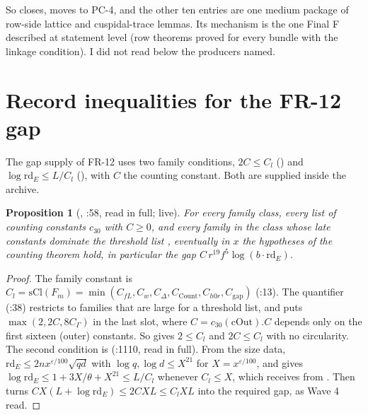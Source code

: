 \documentclass[11pt]{article}
\newcommand{\FR}[1]{\textsf{FR-#1}}
\newcommand{\PC}[1]{\textsf{PC-#1}}
\newtheorem{proposition}[theorem]{Proposition}
\theoremstyle{remark}
\begin{document}
So  closes,  moves to \PC{4}, and the other ten entries are one medium package of row-side lattice and cuspidal-trace lemmas. Its mechanism is the one Final F described at statement level (row theorems proved for every bundle with the linkage condition). I did not read below the producers named.

\section{Record inequalities for the \FR{12} gap}\label{sec:rec}

The gap supply of \FR{12} uses two family conditions, $2C\le C_l$ () and $\log\mathrm{rd}_E\le L/C_l$ (), with $C$ the counting constant. Both are supplied inside the archive.

\begin{proposition}[, :58, read in full; live]
For every family class, every list of counting constants $c_{30}$ with $C\ge0$, and every family in the class whose late constants dominate the threshold list , eventually in $x$ the hypotheses of the counting theorem hold, in particular the gap $C\,r^{19}f^5\log(b\cdot\mathrm{rd}_E)$.
\end{proposition}

\begin{proof}
The family constant is $C_l=\mathrm{sCl}(F_m)=\min(C_{fL},C_w,C_\Delta,C_{\mathrm{Count}},C_{h0r},C_{\mathrm{gap}})$ (:13). The quantifier  (:38) restricts to families that are large for a threshold list, and  puts $\max(2,2C,8C_\Gamma)$ in the last slot, where $C=c_{30}(\mathrm{cOut}).C$ depends only on the first sixteen (outer) constants. So  gives $2\le C_l$ and $2C\le C_l$ with no circularity. The second condition is  (:1110, read in full). From the size data, $\mathrm{rd}_E\le2nx^{\varepsilon/100}\sqrt{qd}$ with $\log q,\log d\le X^{21}$ for $X=x^{\varepsilon/100}$, and  gives $\log\mathrm{rd}_E\le1+3X/\theta+X^{21}\le L/C_l$ whenever $C_l\le X$, which  receives from . Then  turns $C X(L+\log\mathrm{rd}_E)\le2CXL\le C_lXL$ into the required gap, as Wave 4 read.
\end{proof}
\end{document}
